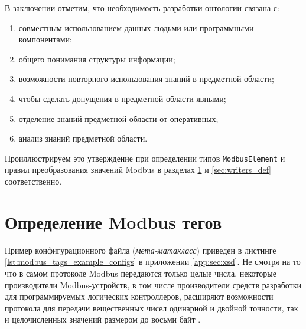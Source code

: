 В заключении отметим, что необходимость разработки онтологии связана с:
\begin{enumerate}
    \item совместным использованием данных людьми или программными компонентами;
    \item общего понимания структуры информации;
    \item возможности повторного использования знаний в предметной области;
    \item чтобы сделать допущения в предметной области явными;
    \item отделение знаний предметной области от оперативных;
    \item анализ знаний предметной области.
\end{enumerate}
Проиллюстрируем это утверждение при определении типов \texttt{ModbusElement} и правил преобразования
значений Modbus в разделах \ref{sec:modbus_tag} и \ref{sec:writers_def} соответственно.


\section{Определение Modbus тегов} \label{sec:modbus_tag}
Пример конфигурационного файла (\textit{мета-матакласс}) приведен в листинге \ref{lst:modbus_tags_example_configs} в приложении \ref{app:sec:xsd}.
Не смотря на то что в самом протоколе Modbus передаются только целые числа, некоторые производители Modbus-устройств,
в том числе производители средств разработки для программируемых логических контроллеров, расширяют возможности протокола
для передачи вещественных чисел одинарной и двойной точности, так и целочисленных значений размером до восьми байт \cite{book:gost:modbus_program_language}.

